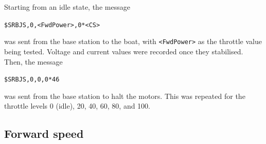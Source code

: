 \documentclass[a4paper]{IEEEtran}
\begin{document}
Starting from an idle state, the message
\begin{center}
\texttt{\$SRBJS,0,<FwdPower>,0*<CS>}
\end{center}
was sent from the base station to the boat, with \texttt{<FwdPower>} as the throttle value being tested. Voltage and current values were recorded once they stabilised. Then, the message
\begin{center}
\texttt{\$SRBJS,0,0,0*46}
\end{center}
was sent from the base station to halt the motors. This was repeated for the throttle levels 0 (idle), 20, 40, 60, 80, and 100.




\subsection{Forward speed}
\end{document}
